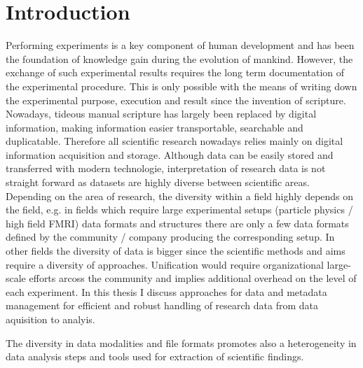 \clearpage
\chapter{Introduction}
\label{sec:intro}

Performing experiments is a key component of human development and has been the foundation of knowledge gain during the evolution of mankind. However, the exchange of such experimental results requires the long term documentation of the  experimental procedure. This is only possible with the means of writing down the experimental purpose, execution and result since the invention of scripture. Nowadays, tideous manual scripture has largely been replaced by digital information, making information easier transportable, searchable and duplicatable. Therefore all scientific research nowadays relies mainly on digital information acquisition and storage. Although data can be easily stored and transferred with modern technologie, interpretation of research data is not straight forward as datasets are highly diverse between scientific areas. Depending on the area of research, the diversity within a field highly depends on the field, e.g. in fields which require large experimental setups (particle physics / high field FMRI) data formats and structures  there are only a few data formats defined by the community / company producing the corresponding setup. In other fields the diversity of data is bigger since the scientific methods and aims require a diversity of approaches. Unification would require organizational large-scale efforts arcoss the community and implies additional overhead on the level of each experiment. In this thesis I discuss approaches for data and metadata management for efficient and robust handling of research data from data aquisition to analyis.

The diversity in data modalities and file formats promotes also a heterogeneity in data analysis steps and tools used for extraction of scientific findings.




